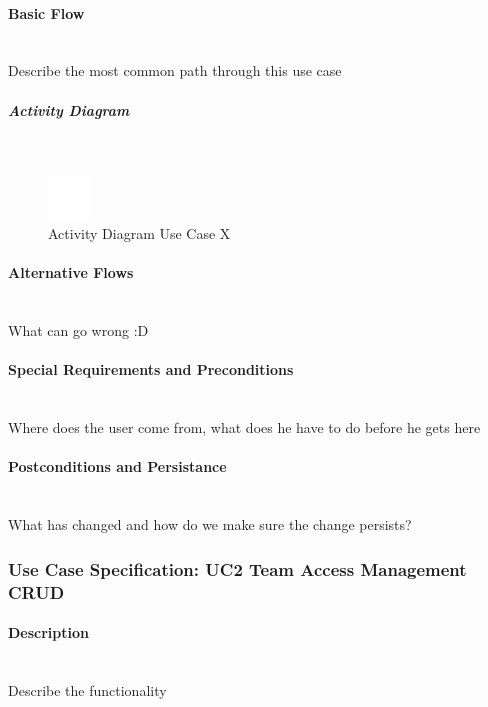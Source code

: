 \paragraph*{Basic Flow} \mbox{}\\

Describe the most common path through this use case

\subparagraph{Activity Diagram}\mbox{}\\
\begin{figure}[h]
	\centering
	\includegraphics[width=0.1\textwidth]{Content/Domain/placeholder.png}
	\caption{Activity Diagram Use Case X}
	\label{fig:activityDiagramX}
\end{figure}

\paragraph*{Alternative Flows}\mbox{}\\
What can go wrong :D

\paragraph*{Special Requirements and Preconditions}\mbox{}\\
Where does the user come from, what does he have to do before he gets here

\paragraph*{Postconditions and Persistance}\mbox{}\\
What has changed and how do we make sure the change persists?


\newpage
\subsubsection{Use Case Specification: \ac{UC}2 Team Access Management CRUD}
\label{sec:domainBbc}

\paragraph*{Description}\mbox{}\\
Describe the functionality

